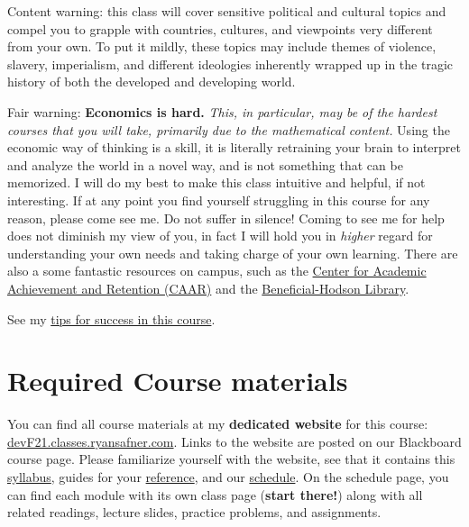 \documentclass{article}
\begin{document}
{Content warning:} this class will cover sensitive political and
cultural topics and compel you to grapple with countries, cultures, and
viewpoints very different from your own. To put it mildly, these topics
may include themes of violence, slavery, imperialism, and different
ideologies inherently wrapped up in the tragic history of both the
developed and developing world.

{Fair warning:} \textbf{Economics is hard.} \emph{This, in particular,
may be of the hardest courses that you will take, primarily due to the
mathematical content.} Using the economic way of thinking is a skill, it
is literally retraining your brain to interpret and analyze the world in
a novel way, and is not something that can be memorized. I will do my
best to make this class intuitive and helpful, if not interesting. If at
any point you find yourself struggling in this course for any reason,
please come see me. Do not suffer in silence! Coming to see me for help
does not diminish my view of you, in fact I will hold you in
\emph{higher} regard for understanding your own needs and taking charge
of your own learning. There are also a some fantastic resources on
campus, such as the
\href{http://www.hood.edu/campus-services/academic-services/index.html}{Center
for Academic Achievement and Retention (CAAR)} and the
\href{http://www.hood.edu/library/}{Beneficial-Hodson Library}.

See my \href{/reference\#tips}{tips for success in this course}.

\hypertarget{required-course-materials}{%
\section{Required Course materials}\label{required-course-materials}}

You can find all course materials at my \textbf{dedicated website} for
this course:
\href{https://devF21.classes.ryansafner.com}{devF21.classes.ryansafner.com}.
Links to the website are posted on our Blackboard course page. Please
familiarize yourself with the website, see that it contains this
\href{https://devF21.classes.ryansafner.com/syllabus/}{syllabus}, guides
for your
\href{https://devF21.classes.ryansafner.com/reference/}{reference}, and
our \href{https://devF21.classes.ryansafner.com/schedule/}{schedule}. On
the schedule page, you can find each module with its own class page
(\textbf{start there!}) along with all related readings, lecture slides,
practice problems, and assignments.
\end{document}
